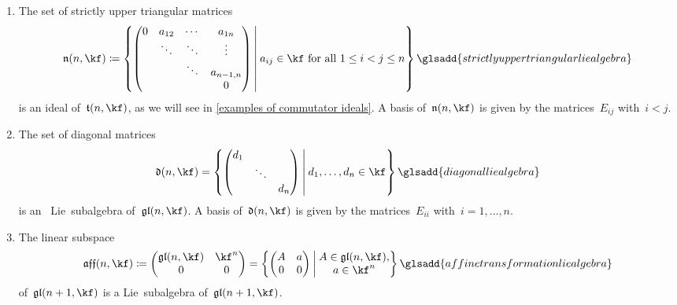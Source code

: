 \begin{examples}
\begin{enumerate}
		\item
			The set of strictly upper triangular matrices
			\[
				\upperlie(n, \kf)
				\defined
				\left\{
					\begin{pmatrix}
							0
						& a_{12}
						& \cdots
						& a_{1n}
						\\
							{}
						& \ddots
						& \ddots
						& \vdots
						\\
							{}
						& {}
						& \ddots
						& a_{n-1,n}
						\\
							{}
						& {}
						& {}
						& 0
					\end{pmatrix}
				\suchthat*
					\text{$a_{ij} \in \kf$ for all~$1 \leq i < j \leq n$}
				\right\}
				\glsadd{strictly upper triangular lie algebra}
			\]
			is an ideal of~$\trianglie(n, \kf)$, as we will see in \cref{examples of commutator ideals}.
			A basis of~$\upperlie(n, \kf)$ is given by the matrices~$E_{ij}$ with~$i < j$.
		\item
			The set of diagonal matrices
			\[
				\diaglie(n, \kf)
				=
				\left\{
					\begin{pmatrix}
							d_1
						& {}
						& {}
						\\
							{}
						& \ddots
						& {}
						\\
							{}
						& {}
						& d_n
					\end{pmatrix}
				\suchthat*
					d_1, \dotsc, d_n \in \kf
				\right\}
				\glsadd{diagonal lie algebra}
			\]
			is an~{} Lie~subalgebra of~$\gllie(n, \kf)$.
			A basis of~$\diaglie(n, \kf)$ is given by the matrices~$E_{ii}$ with~$i = 1, \dotsc, n$.
		\item
			The linear subspace
			\[
				\afflie(n, \kf)
				\defined
				\begin{pmatrix}
					\gllie(n, \kf)  & \kf^n \\
					0               & 0
				\end{pmatrix}
				=
				\left\{
					\begin{pmatrix}
						A & a \\
						0 & 0
					\end{pmatrix}
				\suchthat*
				\begin{array}{@{}c@{}}
						A \in \gllie(n, \kf), \\
						a \in \kf^n
					\end{array}
				\right\}
				\glsadd{affine transformation lie algebra}
			\]
			of~$\gllie(n+1, \kf)$ is a Lie~subalgebra of~$\gllie(n+1, \kf)$.

\end{enumerate}
\end{examples}
